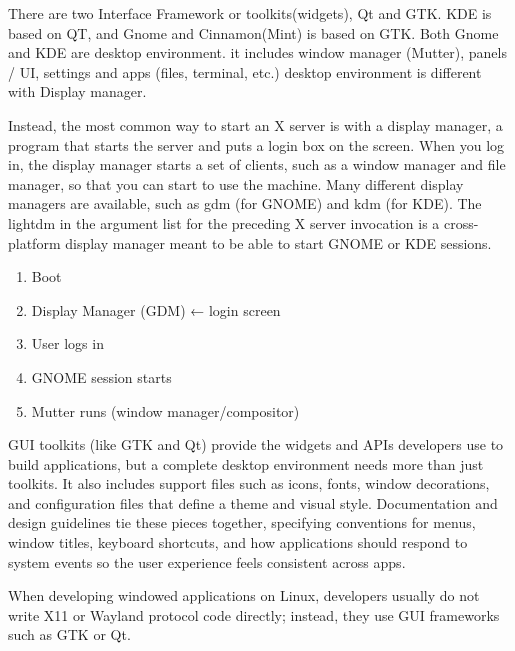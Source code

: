 \documentclass[paper=8.5in:11in, twoside, 12pt, pagesize=pdftex]{book}
\begin{document}
	\par There are two Interface Framework or toolkits(widgets), Qt and GTK.  KDE is based on QT, and Gnome and Cinnamon(Mint) is based on GTK. Both Gnome and KDE are desktop environment. it includes window manager (Mutter), panels / UI, settings and apps (files, terminal, etc.) desktop environment is different with Display manager.  

	\par Instead, the most common way to start an X server is with a display manager, a program that starts the server and puts a login box on the screen. When you log in, the display manager starts a set of clients, such as a window manager and file manager, so that you can start to use the machine. Many different display managers are available, such as gdm (for GNOME) and kdm (for KDE). The lightdm in the argument list for the preceding X server invocation is a cross-platform display manager meant to be able to start GNOME or KDE sessions.

\begin{enumerate}
\item Boot
\item Display Manager (GDM)  ← login screen
\item User logs in
\item GNOME session starts
\item Mutter runs (window manager/compositor)
\end{enumerate}

	\par GUI toolkits (like GTK and Qt) provide the widgets and APIs developers use to build applications, but a complete desktop environment needs more than just toolkits. It also includes support files such as icons, fonts, window decorations, and configuration files that define a theme and visual style. Documentation and design guidelines tie these pieces together, specifying conventions for menus, window titles, keyboard shortcuts, and how applications should respond to system events so the user experience feels consistent across apps.
	
	\par When developing windowed applications on Linux, developers usually do not write X11 or Wayland protocol code directly; instead, they use GUI frameworks such as GTK or Qt.
	
\end{document}
